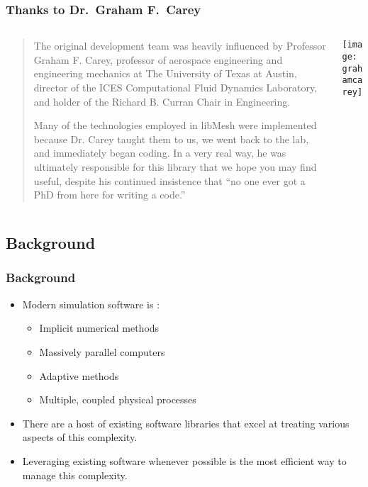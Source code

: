 \frame
{
  \frametitle{Thanks to Dr.\ Graham F.\ Carey}

  \begin{columns}
    \begin{column}{.55\textwidth}
      \scriptsize
      \begin{quote}
        The original development team was heavily influenced by Professor Graham F. Carey, professor of aerospace engineering and engineering mechanics at The University of Texas at Austin, director of the ICES Computational Fluid Dynamics Laboratory, and holder of the Richard B. Curran Chair in Engineering.

        Many of the technologies employed in libMesh were implemented because Dr. Carey taught them to us, we went back to the lab, and immediately began coding. In a very real way, he was ultimately responsible for this library that we hope you may find useful, despite his continued insistence that ``no one ever got a PhD from here for writing a code.''       
      \end{quote}
\normalsize
    \end{column}
    \begin{column}{.45\textwidth}
      \texttt{[image: grahamcarey]}
    \end{column}
  \end{columns}
}

\subsection{Background}
\frame
{
  \frametitle{Background}                 

  \begin{itemize}
  \item Modern simulation software is :
    \begin{itemize}
    \item Implicit numerical methods
    \item Massively parallel computers
    \item Adaptive methods
    \item Multiple, coupled physical processes
    \end{itemize}
  \item There are a host of existing software libraries that excel at treating various aspects of this complexity.
  \item Leveraging existing software whenever possible is the most efficient way to manage this complexity.

  \end{itemize}
}


